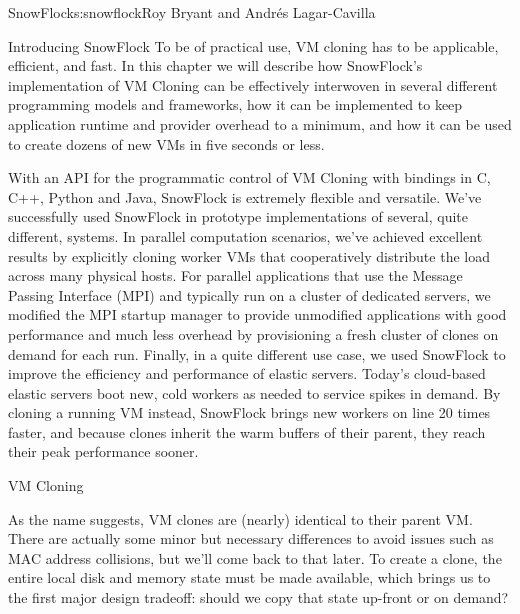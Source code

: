\begin{aosachapter}{SnowFlock}{s:snowflock}{Roy Bryant and Andr\'e{s} Lagar-Cavilla}
\begin{aosasect1}{Introducing SnowFlock}
To be of practical use, VM cloning has to be applicable, efficient,
and fast. In this chapter we will describe how SnowFlock's
implementation of VM Cloning can be effectively interwoven in several
different programming models and frameworks, how it can be implemented
to keep application runtime and provider overhead to a minimum, and
how it can be used to create dozens of new VMs in five seconds or
less.

With an API for the programmatic control of VM Cloning with bindings
in C, C++, Python and Java, SnowFlock is extremely flexible and
versatile.  We've successfully used SnowFlock in prototype
implementations of several, quite different, systems.  In parallel
computation scenarios, we've achieved excellent results by explicitly
cloning worker VMs that cooperatively distribute the load across many
physical hosts. For parallel applications that use the Message Passing
Interface (MPI) and typically run on a cluster of dedicated servers,
we modified the MPI startup manager to provide unmodified applications
with good performance and much less overhead by provisioning a fresh
cluster of clones on demand for each run. Finally, in a quite
different use case, we used SnowFlock to improve the efficiency and
performance of elastic servers.  Today's cloud-based elastic servers
boot new, cold workers as needed to service spikes in demand. By
cloning a running VM instead, SnowFlock brings new workers on line 20
times faster, and because clones inherit the warm buffers of their
parent, they reach their peak performance sooner.

\end{aosasect1}

\begin{aosasect1}{VM Cloning}

As the name suggests, VM clones are (nearly) identical to their parent
VM\@. There are actually some minor but necessary differences to avoid
issues such as MAC address collisions, but we'll come back to that
later. To create a clone, the entire local disk and memory state must
be made available, which brings us to the first major design tradeoff:
should we copy that state up-front or on demand?


\end{aosasect1}
\end{aosachapter}
